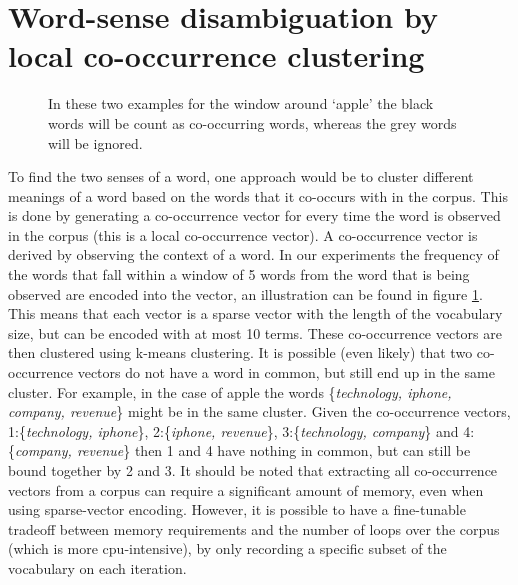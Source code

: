 \documentclass[11pt]{article}
\begin{document}
\section{Word-sense disambiguation by local co-occurrence clustering}
\label{remi}
\begin{figure}
\center
{}

\caption{In these two examples for the window around `apple' the black words will be count as co-occurring words, whereas the grey words will be ignored.}
\label{window}
\end{figure}
To find the two senses of a word, one approach would be to cluster different meanings of a word based on the words that it co-occurs with in the corpus. This is done by generating a co-occurrence vector for every time the word is observed in the corpus (this is a local co-occurrence vector). A co-occurrence vector is derived by observing the context of a word. In our experiments the frequency of the words that fall within a window of 5 words from the word that is being observed are encoded into the vector, an illustration can be found in figure \ref{window}. This means that each vector is a sparse vector with the length of the vocabulary size, but can be encoded with at most 10 terms. These co-occurrence vectors are then clustered using k-means clustering. It is possible (even likely) that two co-occurrence vectors do not have a word in common, but still end up in the same cluster. For example, in the case of apple the words \{\textit{technology, iphone, company, revenue}\} might be in the same cluster. Given the co-occurrence vectors, 1:\{\textit{technology, iphone}\}, 2:\{\textit{iphone, revenue}\}, 3:\{\textit{technology, company}\} and 4:\{\textit{company, revenue}\} then 1 and 4 have nothing in common, but can still be bound together by 2 and 3. It should be noted that extracting all co-occurrence vectors from a corpus can require a significant amount of memory, even when using sparse-vector encoding. However, it is possible to have a fine-tunable tradeoff between memory requirements and the number of loops over the corpus (which is more cpu-intensive), by only recording a specific subset of the vocabulary on each iteration.
\end{document}
